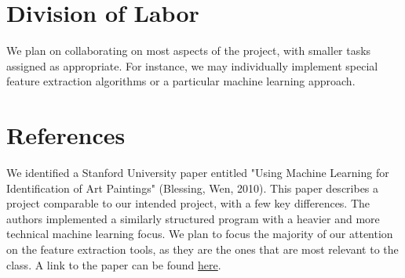 \documentclass{article}
\begin{document}
\section{Division of Labor}
We plan on collaborating on most aspects of the project, with smaller tasks
assigned as appropriate. For instance, we may individually implement special
feature extraction algorithms or a particular machine learning approach. \\

\appendix
\section{References}
We identified a Stanford University paper entitled "Using Machine Learning for
Identification of Art Paintings" (Blessing, Wen, 2010). This paper describes a
project comparable to our intended project, with a few key differences. The
authors implemented a similarly structured program with a heavier and more
technical machine learning focus. We plan to focus the majority of our
attention on the feature extraction tools, as they are the ones that are most
relevant to the class. A link to the paper can be found
\href{http://cs229.stanford.edu/proj2010/BlessingWen-UsingMachineLearningForIdentificationOfArtPaintings.pdf}{here}.
\end{document}
